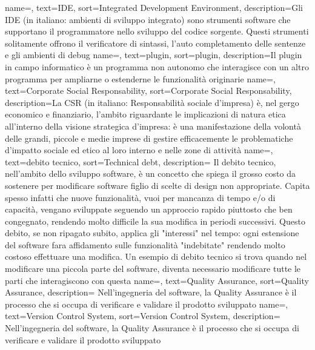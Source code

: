 {
	name=,
	text=IDE,
	sort=Integrated Development Environment,
	description={Gli IDE (in italiano: ambienti di sviluppo integrato) sono strumenti software che supportano il programmatore nello sviluppo del codice sorgente. Questi strumenti solitamente offrono il verificatore di sintassi, l'auto completamento delle sentenze e gli ambienti di debug}
}
{
	name=,
	text=plugin,
	sort=plugin,
	description={Il plugin in campo informatico è un programma non autonomo che interagisce con un altro programma per ampliarne o estenderne le funzionalità originarie}
}
{
	name=,
	text=Corporate Social Responsability,
	sort=Corporate Social Responsability,
	description={La CSR (in italiano: Responsabilità sociale d'impresa) è, nel gergo economico e finanziario, l'ambito riguardante le implicazioni di natura etica all'interno della visione strategica d'impresa: è una manifestazione della volontà delle grandi, piccole e medie imprese di gestire efficacemente le problematiche d'impatto sociale ed etico al loro interno e nelle zone di attività}
}
{
	name=,
	text=debito tecnico,
	sort=Technical debt,
	description={ Il debito tecnico, nell'ambito dello sviluppo software, è un concetto che spiega il grosso costo da sostenere per modificare software figlio di scelte di design non appropriate. Capita spesso infatti che nuove funzionalità, vuoi per mancanza di tempo e/o di capacità, vengano sviluppate seguendo un approccio rapido piuttosto che ben congegnato, rendendo molto difficile la sua modifica in periodi successivi. Questo debito, se non ripagato subito, applica gli "interessi" nel tempo: ogni estensione del software fara affidamento sulle funzionalità "indebitate" rendendo molto costoso effettuare una modifica. Un esempio di debito tecnico si trova quando nel modificare una piccola parte del software, diventa necessario modificare tutte le parti che interagiscono con questa}
}
{
	name=,
	text=Quality Assurance,
	sort=Quality Assurance,
	description={ Nell'ingegneria del software, la Quality Assurance è il processo che si occupa di verificare e validare il prodotto sviluppato}
}
{
	name=,
	text=Version Control System,
	sort=Version Control System,
	description={ Nell'ingegneria del software, la Quality Assurance è il processo che si occupa di verificare e validare il prodotto sviluppato}
}
